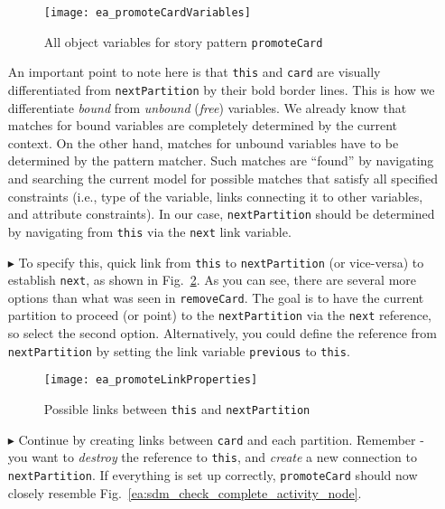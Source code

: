 \begin{itemize}
\begin{figure}[htbp]
\begin{center}
  \texttt{[image: ea\_promoteCardVariables]}
  \caption{All object variables for story pattern \texttt{promoteCard}}
  \label{ea:sdm_check_complete_sp}
\end{center}
\end{figure}

An important point to note here is that \texttt{this} and \texttt{card} are visually differentiated from \texttt{nextPartition} by
their bold border lines. This is how we differentiate \emph{bound} from \emph{unbound} (\emph{free}) variables. We already know that matches for bound
variables are completely determined by the current context. On the other hand, matches for unbound variables have to be determined by the pattern matcher. Such
matches are ``found'' by navigating and searching the current model for possible matches that satisfy all specified constraints (i.e., type of the variable,
links connecting it to other variables, and attribute constraints). In our case, \texttt{nextPartition} should be determined by navigating from
\texttt{this} via the \texttt{next} link variable.

\vspace{0.5cm}

\item[$\blacktriangleright$] To specify this, quick link from \texttt{this} to \texttt{nextPartition} (or vice-versa) to establish
\texttt{next}, as shown in Fig.~\ref{ea:sdm_check_link_variable}. As you can see, there are several more options than what was seen in
\texttt{removeCard}. The goal is to have the current partition to proceed (or point) to the \texttt{nextPartition} via the \texttt{next} reference, so select
the second option. Alternatively, you could define the reference from \texttt{nextPartition} by setting the link variable \texttt{previous} to \texttt{this}.

\begin{figure}[htbp]
\begin{center}
  \texttt{[image: ea\_promoteLinkProperties]}
  \caption{Possible links between \texttt{this} and \texttt{nextPartition}}
  \label{ea:sdm_check_link_variable}
\end{center}
\end{figure}

\vspace{0.5cm}

\item[$\blacktriangleright$] Continue by creating links between \texttt{card} and each partition. Remember - you want to \emph{destroy} the reference to
\texttt{this}, and \emph{create} a new connection to \texttt{nextPartition}. If everything is set up correctly, \texttt{promoteCard} should now closely resemble
Fig.~\ref{ea:sdm_check_complete_activity_node}.


\end{itemize}
